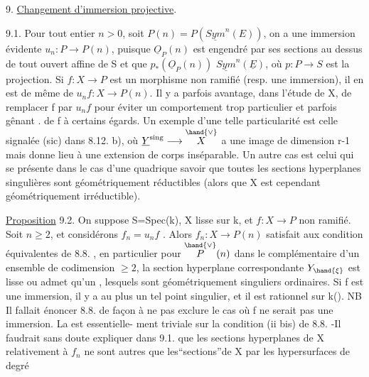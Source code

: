 
9. \uline{Changement d'immersion projective}.

9.1. Pour tout entier $n > 0$, soit $P(n) = P(\underline{Sym}^n(E))$, on a une
immersion évidente $u_n\colon P \to P(n)$, puisque $\underline{O}_P(n)$ est engendré par
ses sections au dessus de tout ouvert affine de S et que $p_*(\underline{O}_P(n))$
$\underline{Sym}^n(\underline{E})$, où $p\colon P \to S$ est la projection. Si $f\colon X\to P$ est un morphisme
non ramifié (resp. une immersion), il en est de même de $u_n f\colon X \to P(n)$.
Il y a parfois avantage, dans l'étude de X, de  remplacer f par $u_n f$ 
pour éviter un comportement trop particulier et parfois  gênant .
de f à certains égards. Un exemple d'une telle particularité est celle
 signalée (sic) dans 8.12. b),  où $\underline{Y}^{\mathrm{sing}} \longrightarrow \overset{\hand{\vee}}{X}$ a une image de
dimension r-1 mais  donne lieu à une extension
de corps inséparable. Un autre cas est celui qui se présente dans le cas
d'une quadrique  savoir que
toutes les sections hyperplanes singulières sont géométriquement
réductibles (alors que X est cependant géométriquement irréductible).

\uline{Proposition} 9.2. On suppose S=Spec(k), X lisse sur k, et $f\colon X\to P$ non
ramifié. Soit $n \geq 2$, et considérons $f_n = u_n f$ . Alors $f_n : X \to P(n)$
satisfait aux condition équivalentes de 8.8. , en particulier
pour \hand{$\xi \in$} $\overset{\hand{\vee}}{P}(n)$ dans le complémentaire d'un ensemble de codimension $\geq 2$,
la section hyperplane correspondante $Y_{\hand{\xi}}$ est lisse  ou admet qu'un
, lesquels sont géométriquement singuliers
ordinaires. Si f est une immersion, il y a au
plus un tel point singulier, et il est rationnel sur k(\hand{$\xi$}).
\margin{$\|$} NB Il fallait énoncer 8.8. de façon à  ne pas exclure le
cas où f ne serait pas une immersion. La  est essentielle-%
ment triviale sur la condition (ii bis) de 8.8. -Il faudrait sans doute
expliquer dans 9.1. que les sections hyperplanes de X relativement à
 $f_n$ ne sont autres que les``sections''de X par les hypersurfaces de degré
